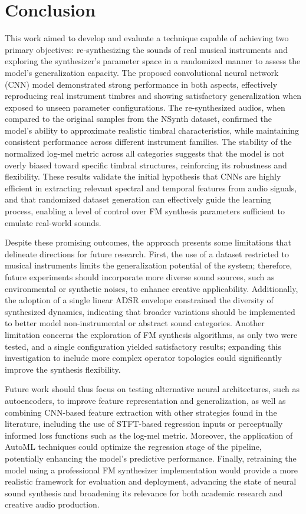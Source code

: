 \documentclass[10pt,conference]{IEEEtran}
\begin{document}
\section{Conclusion} \label{sec:conclusion}

This work aimed to develop and evaluate a technique capable of achieving two primary objectives: re-synthesizing the sounds of real musical instruments and exploring the synthesizer’s parameter space in a randomized manner to assess the model’s generalization capacity. The proposed convolutional neural network (CNN) model demonstrated strong performance in both aspects, effectively reproducing real instrument timbres and showing satisfactory generalization when exposed to unseen parameter configurations. The re-synthesized audios, when compared to the original samples from the NSynth dataset, confirmed the model’s ability to approximate realistic timbral characteristics, while maintaining consistent performance across different instrument families. The stability of the normalized log-mel metric across all categories suggests that the model is not overly biased toward specific timbral structures, reinforcing its robustness and flexibility. These results validate the initial hypothesis that CNNs are highly efficient in extracting relevant spectral and temporal features from audio signals, and that randomized dataset generation can effectively guide the learning process, enabling a level of control over FM synthesis parameters sufficient to emulate real-world sounds.

Despite these promising outcomes, the approach presents some limitations that delineate directions for future research. First, the use of a dataset restricted to musical instruments limits the generalization potential of the system; therefore, future experiments should incorporate more diverse sound sources, such as environmental or synthetic noises, to enhance creative applicability. Additionally, the adoption of a single linear ADSR envelope constrained the diversity of synthesized dynamics, indicating that broader variations should be implemented to better model non-instrumental or abstract sound categories. Another limitation concerns the exploration of FM synthesis algorithms, as only two were tested, and a single configuration yielded satisfactory results; expanding this investigation to include more complex operator topologies could significantly improve the synthesis flexibility.

Future work should thus focus on testing alternative neural architectures, such as autoencoders, to improve feature representation and generalization, as well as combining CNN-based feature extraction with other strategies found in the literature, including the use of STFT-based regression inputs or perceptually informed loss functions such as the log-mel metric. Moreover, the application of AutoML techniques could optimize the regression stage of the pipeline, potentially enhancing the model’s predictive performance. Finally, retraining the model using a professional FM synthesizer implementation would provide a more realistic framework for evaluation and deployment, advancing the state of neural sound synthesis and broadening its relevance for both academic research and creative audio production.
\end{document}
